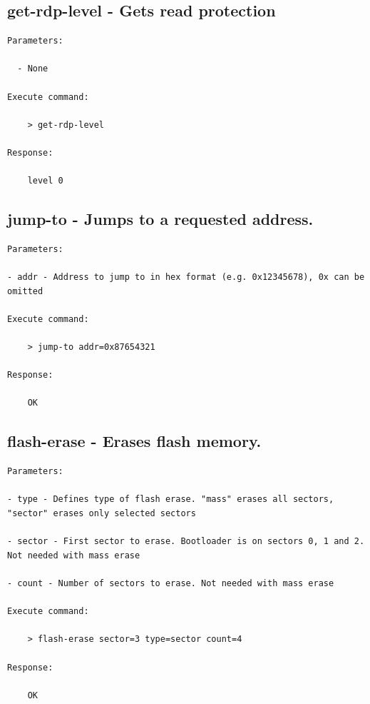 \subsection{get-rdp-level - Gets read protection \texorpdfstring{\protect\cite[p.~93]{stm32f407_ref_man}}{}}
\label{bl_cmd:get-rdp-level}

\begin{lstlisting}
Parameters:

  - None

Execute command: 

    > get-rdp-level  
    
Response: 

    level 0
\end{lstlisting}
    
\subsection{jump-to - Jumps to a requested address.}
\label{bl_cmd:jump-to}

\begin{lstlisting}
Parameters:

- addr - Address to jump to in hex format (e.g. 0x12345678), 0x can be omitted

Execute command: 

    > jump-to addr=0x87654321 
     
Response: 

    OK
\end{lstlisting}
     
\subsection{flash-erase - Erases flash memory.}
\label{bl_cmd:flash-erase}

\begin{lstlisting}
Parameters:

- type - Defines type of flash erase. "mass" erases all sectors, "sector" erases only selected sectors
    
- sector - First sector to erase. Bootloader is on sectors 0, 1 and 2. Not needed with mass erase
    
- count - Number of sectors to erase. Not needed with mass erase

Execute command: 

    > flash-erase sector=3 type=sector count=4 
     
Response: 

    OK
\end{lstlisting}

